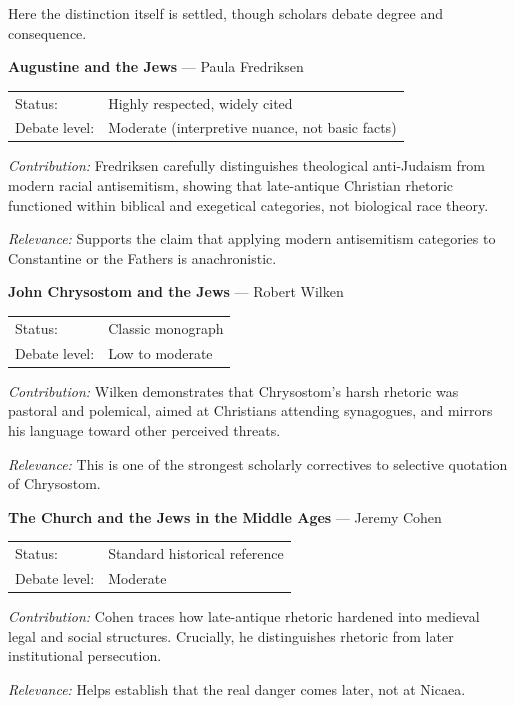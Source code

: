 \documentclass[10pt,twoside,openany]{book}
\begin{document}
Here the distinction itself is settled, though scholars debate degree
and consequence.

\medskip

\textbf{Augustine and the Jews} --- Paula Fredriksen

\begin{tabular}{@{}ll@{}}
Status: & Highly respected, widely cited \\
Debate level: & Moderate (interpretive nuance, not basic facts)
\end{tabular}

\emph{Contribution:}
Fredriksen carefully distinguishes theological anti-Judaism from
modern racial antisemitism, showing that late-antique Christian
rhetoric functioned within biblical and exegetical categories, not
biological race theory.

\emph{Relevance:}
Supports the claim that applying modern antisemitism categories to
Constantine or the Fathers is anachronistic.

\medskip

\textbf{John Chrysostom and the Jews} --- Robert Wilken

\begin{tabular}{@{}ll@{}}
Status: & Classic monograph \\
Debate level: & Low to moderate
\end{tabular}

\emph{Contribution:}
Wilken demonstrates that Chrysostom's harsh rhetoric was pastoral and
polemical, aimed at Christians attending synagogues, and mirrors his
language toward other perceived threats.

\emph{Relevance:}
This is one of the strongest scholarly correctives to selective
quotation of Chrysostom.

\medskip

\textbf{The Church and the Jews in the Middle Ages} --- Jeremy Cohen

\begin{tabular}{@{}ll@{}}
Status: & Standard historical reference \\
Debate level: & Moderate
\end{tabular}

\emph{Contribution:}
Cohen traces how late-antique rhetoric hardened into medieval legal
and social structures. Crucially, he distinguishes rhetoric from
later institutional persecution.

\emph{Relevance:}
Helps establish that the real danger comes later, not at Nicaea.
\end{document}
